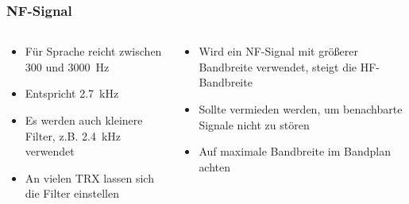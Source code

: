 \begin{frame}
\frametitle{NF-Signal}
\begin{columns}
    \begin{column}{0.48\textwidth}
    \begin{itemize}
  \item Für Sprache reicht zwischen 300 und \qty{3000}{\hertz}
  \item Entspricht \qty{2,7}{\kilo\hertz}
  \item Es werden auch kleinere Filter, z.B. \qty{2,4}{\kilo\hertz} verwendet
  \item An vielen TRX lassen sich die Filter einstellen
  \end{itemize}

    \end{column}
   \begin{column}{0.48\textwidth}
       \begin{itemize}
  \item Wird ein NF-Signal mit größerer Bandbreite verwendet, steigt die HF-Bandbreite
  \item Sollte vermieden werden, um benachbarte Signale nicht zu stören
  \item Auf maximale Bandbreite im Bandplan achten
  \end{itemize}

   \end{column}
\end{columns}

\end{frame}

\begin{frame}

\end{frame}

